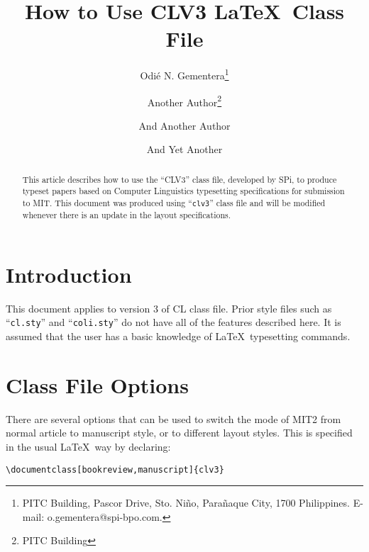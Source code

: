 \documentclass[manuscript]{clv3}
\begin{document}
\clearpage
\let\cleardoublepage\clearpage


\title{How to Use CLV3 \LaTeX\ Class File}

\author{Odi\'e N. Gementera\thanks{PITC Building, Pascor Drive, Sto. Ni\~no, Para\~naque City, 1700 Philippines. E-mail: o.gementera@spi-bpo.com.}}

\author{Another Author\thanks{PITC Building}}

\author{And Another Author}

\author{And Yet Another}

\maketitle


\begin{abstract}
This article describes how to use the ``CLV3'' class file, developed by {\sf SPi}, 
to produce typeset papers based on Computer Linguistics typesetting specifications 
for submission to MIT. This document was produced using ``{\tt clv3}'' class file 
and will be modified whenever there is an update in the layout specifications.
\end{abstract}

\section{Introduction}

This document applies to version 3 of CL class file. Prior style files such as 
``{\tt cl.sty}'' and ``{\tt coli.sty}'' do not have all of the features 
described here. It is assumed that the user has a basic knowledge of \LaTeX\ 
typesetting commands.

\section{Class File Options}

There are several options that can be used to switch the mode of MIT2 from normal 
article to manuscript style, or to different layout styles. This is specified in 
the usual \LaTeX\ way by declaring:

\verb|\documentclass[bookreview,manuscript]{clv3}|

\end{document}

